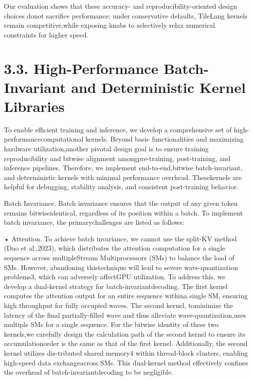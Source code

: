 \documentclass[
  10
]{article}
\begin{document}
Our evaluation shows that these accuracy- and reproducibility-oriented
design choices donot sacrifice performance: under conservative defaults,
TileLang kernels remain competitive,while exposing knobs to selectively
relax numerical constraints for higher speed.

\section{3.3. High-Performance Batch-Invariant and Deterministic Kernel
Libraries}\label{high-performance-batch-invariant-and-deterministic-kernel-libraries}

To enable efficient training and inference, we develop a comprehensive
set of high-performancecomputational kernels. Beyond basic
functionalities and maximizing hardware utilization,another pivotal
design goal is to ensure training reproducibility and bitwise alignment
amongpre-training, post-training, and inference pipelines. Therefore, we
implement end-to-end,bitwise batch-invariant, and deterministic kernels
with minimal performance overhead. Thesekernels are helpful for
debugging, stability analysis, and consistent post-training behavior.

Batch Invariance. Batch invariance ensures that the output of any given
token remains bitwiseidentical, regardless of its position within a
batch. To implement batch invariance, the primarychallenges are listed
as follows:

• Attention. To achieve batch invariance, we cannot use the split-KV
method (Dao et al.,2023), which distributes the attention computation
for a single sequence across multipleStream Multiprocessors (SMs) to
balance the load of SMs. However, abandoning thistechnique will lead to
severe wave-quantization problems3, which can adversely affectGPU
utilization. To address this, we develop a dual-kernel strategy for
batch-invariantdecoding. The first kernel computes the attention output
for an entire sequence withina single SM, ensuring high throughput for
fully occupied waves. The second kernel, tominimize the latency of the
final partially-filled wave and thus alleviate wave-quantization,uses
multiple SMs for a single sequence. For the bitwise identity of these
two kernels,we carefully design the calculation path of the second
kernel to ensure its accumulationorder is the same as that of the first
kernel. Additionally, the second kernel utilizes dis-tributed shared
memory4 within thread-block clusters, enabling high-speed data
exchangeacross SMs. This dual-kernel method effectively confines the
overhead of batch-invariantdecoding to be negligible.
\end{document}
